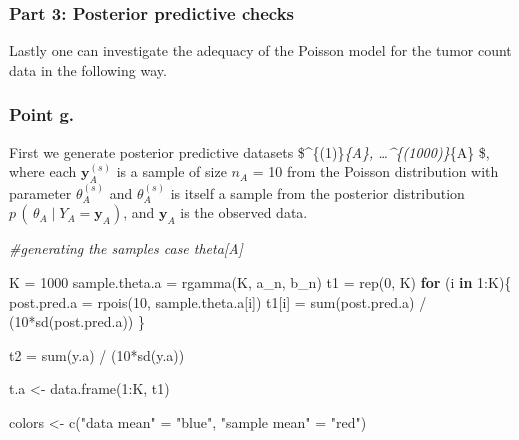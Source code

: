 \documentclass[
  11pt,
]{article}
\newenvironment{Shaded}{\begin{snugshade}}{\end{snugshade}}
\newcommand{\CommentTok}[1]{\textcolor[rgb]{0.56,0.35,0.01}{\textit{#1}}}
\newcommand{\ControlFlowTok}[1]{\textcolor[rgb]{0.13,0.29,0.53}{\textbf{#1}}}
\newcommand{\DecValTok}[1]{\textcolor[rgb]{0.00,0.00,0.81}{#1}}
\newcommand{\FunctionTok}[1]{\textcolor[rgb]{0.00,0.00,0.00}{#1}}
\newcommand{\NormalTok}[1]{#1}
\newcommand{\OtherTok}[1]{\textcolor[rgb]{0.56,0.35,0.01}{#1}}
\newcommand{\SpecialCharTok}[1]{\textcolor[rgb]{0.00,0.00,0.00}{#1}}
\newcommand{\StringTok}[1]{\textcolor[rgb]{0.31,0.60,0.02}{#1}}
\begin{document}
\hypertarget{part-3-posterior-predictive-checks}{%
\subsubsection{Part 3: Posterior predictive
checks}\label{part-3-posterior-predictive-checks}}

Lastly one can investigate the adequacy of the Poisson model for the
tumor count data in the following way.

\hypertarget{point-g.}{%
\subsubsection{Point g.}\label{point-g.}}

First we generate posterior predictive datasets
\$\^{}\{(1)\}\emph{\{A\},
\ldots{}\^{}\{(1000)\}}\{A\} \$, where each
\(\mathbf{y}^{(s)}_{A}\) is a sample of size \(n_A\) = 10 from the
Poisson distribution with parameter \(\theta^{(s)}_{A}\) and
\(\theta^{(s)}_{A}\) is itself a sample from the posterior distribution
\(p \, ( \, \theta_A \; | \; Y_A = \mathbf{y}_A)\), and \(\mathbf{y}_A\)
is the observed data.

\scriptsize

\begin{Shaded}
\begin{Highlighting}[]
\CommentTok{\#generating the samples case theta[A]}

\NormalTok{K }\OtherTok{=} \DecValTok{1000}
\NormalTok{sample.theta.a }\OtherTok{=} \FunctionTok{rgamma}\NormalTok{(K, a\_n, b\_n)}
\NormalTok{t1 }\OtherTok{=} \FunctionTok{rep}\NormalTok{(}\DecValTok{0}\NormalTok{, K)}
\ControlFlowTok{for}\NormalTok{ (i }\ControlFlowTok{in} \DecValTok{1}\SpecialCharTok{:}\NormalTok{K)\{}
\NormalTok{  post.pred.a }\OtherTok{=} \FunctionTok{rpois}\NormalTok{(}\DecValTok{10}\NormalTok{, sample.theta.a[i])}
\NormalTok{  t1[i] }\OtherTok{=} \FunctionTok{sum}\NormalTok{(post.pred.a) }\SpecialCharTok{/}\NormalTok{ (}\DecValTok{10}\SpecialCharTok{*}\FunctionTok{sd}\NormalTok{(post.pred.a))}
\NormalTok{\}}

\NormalTok{t2 }\OtherTok{=}  \FunctionTok{sum}\NormalTok{(y.a) }\SpecialCharTok{/}\NormalTok{ (}\DecValTok{10}\SpecialCharTok{*}\FunctionTok{sd}\NormalTok{(y.a))}

\NormalTok{t.a }\OtherTok{\textless{}{-}} \FunctionTok{data.frame}\NormalTok{(}\DecValTok{1}\SpecialCharTok{:}\NormalTok{K, t1)}

\NormalTok{colors }\OtherTok{\textless{}{-}} \FunctionTok{c}\NormalTok{(}\StringTok{"data mean"} \OtherTok{=} \StringTok{"blue"}\NormalTok{, }\StringTok{"sample mean"} \OtherTok{=} \StringTok{"red"}\NormalTok{)}
\end{Highlighting}
\end{Shaded}
\end{document}
